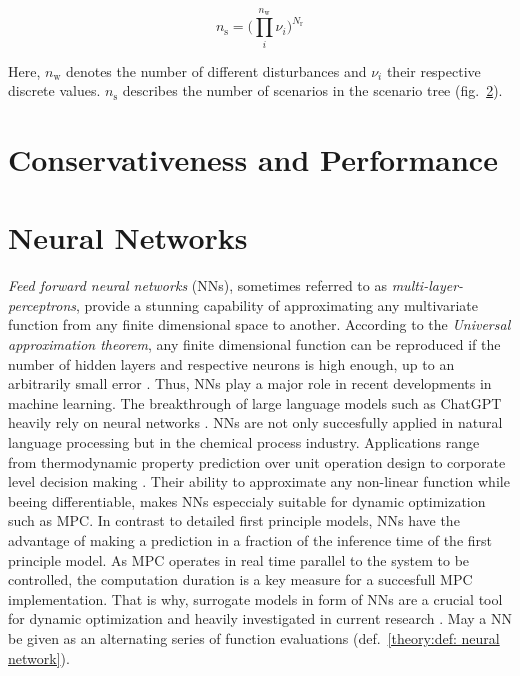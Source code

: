 \begin{equation}
    \label{theory:eq: number scenarios}
   n_\text{s} = \bigg ( \prod^{n_\text{w}}_i \nu_i \bigg ) ^{N_{\text{r}}}
\end{equation}

Here, $n_\text{w}$ denotes the number of different disturbances and $\nu_i$ their respective discrete values. $n_\text{s}$
describes the number of scenarios in the scenario tree (fig.~\ref{}).



\section{Conservativeness and Performance}




\section{Neural Networks}
 
\emph{Feed forward neural networks} (NNs), sometimes referred to as \emph{multi-layer-perceptrons},
provide a stunning capability of approximating any multivariate function from any finite dimensional
space to another. According to the \emph{Universal approximation theorem}, any finite dimensional function can be reproduced if the number of hidden
layers and respective neurons is high enough, up to an arbitrarily small error \cite{hornik1990}. Thus, NNs play a major role in
recent developments in machine learning. The breakthrough of large language models such as ChatGPT heavily rely on neural
networks \cite{vaswani2023}. NNs are not only succesfully applied in natural language processing but in the chemical process industry.
Applications range from thermodynamic property prediction over unit operation design to corporate level decision making \cite{mcbride2019}.
Their ability to approximate any non-linear function while beeing differentiable, makes NNs especcialy suitable for dynamic optimization
such as MPC. In contrast to detailed first principle models, NNs have the advantage of making a prediction in a fraction of the inference time
of the first principle model. As MPC operates in real time parallel to the system to be controlled, the computation duration is a key measure
for a succesfull MPC implementation. That is why, surrogate models in form of NNs are a crucial tool for dynamic optimization and heavily investigated
in current research \cite{salzmann2024l4casadi}. May a NN be given as an alternating series of function evaluations (def.~\ref{theory:def: neural network}).

